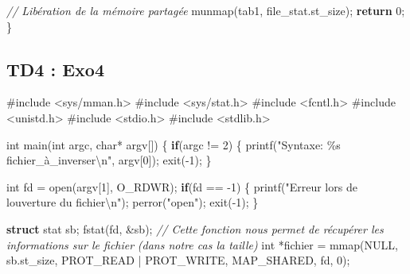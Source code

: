 \documentclass[
]{article}
\newenvironment{Shaded}{}{}
\newcommand{\CommentTok}[1]{\textcolor[rgb]{0.38,0.63,0.69}{\textit{#1}}}
\newcommand{\ControlFlowTok}[1]{\textcolor[rgb]{0.00,0.44,0.13}{\textbf{#1}}}
\newcommand{\DataTypeTok}[1]{\textcolor[rgb]{0.56,0.13,0.00}{#1}}
\newcommand{\DecValTok}[1]{\textcolor[rgb]{0.25,0.63,0.44}{#1}}
\newcommand{\ImportTok}[1]{#1}
\newcommand{\KeywordTok}[1]{\textcolor[rgb]{0.00,0.44,0.13}{\textbf{#1}}}
\newcommand{\NormalTok}[1]{#1}
\newcommand{\PreprocessorTok}[1]{\textcolor[rgb]{0.74,0.48,0.00}{#1}}
\newcommand{\SpecialCharTok}[1]{\textcolor[rgb]{0.25,0.44,0.63}{#1}}
\newcommand{\StringTok}[1]{\textcolor[rgb]{0.25,0.44,0.63}{#1}}
\begin{document}
\begin{Shaded}
\begin{Highlighting}[]
    \CommentTok{// Libération de la mémoire partagée}
\NormalTok{    munmap(tab1, file\_stat.st\_size);}
    \ControlFlowTok{return} \DecValTok{0}\NormalTok{;}
\NormalTok{\}}
\end{Highlighting}
\end{Shaded}

\hypertarget{td4-exo4}{%
\subsection{TD4 : Exo4}\label{td4-exo4}}

\begin{Shaded}
\begin{Highlighting}[]
\PreprocessorTok{\#include }\ImportTok{\textless{}sys/mman.h\textgreater{}}
\PreprocessorTok{\#include }\ImportTok{\textless{}sys/stat.h\textgreater{}}
\PreprocessorTok{\#include }\ImportTok{\textless{}fcntl.h\textgreater{}}
\PreprocessorTok{\#include }\ImportTok{\textless{}unistd.h\textgreater{}}
\PreprocessorTok{\#include }\ImportTok{\textless{}stdio.h\textgreater{}}
\PreprocessorTok{\#include }\ImportTok{\textless{}stdlib.h\textgreater{}}

\DataTypeTok{int}\NormalTok{ main(}\DataTypeTok{int}\NormalTok{ argc, }\DataTypeTok{char}\NormalTok{* argv[]) \{}
    \ControlFlowTok{if}\NormalTok{(argc != }\DecValTok{2}\NormalTok{) \{}
\NormalTok{        printf(}\StringTok{"Syntaxe: \%s fichier\_à\_inverser}\SpecialCharTok{\textbackslash{}n}\StringTok{"}\NormalTok{, argv[}\DecValTok{0}\NormalTok{]);}
\NormalTok{        exit({-}}\DecValTok{1}\NormalTok{);}
\NormalTok{    \}}

    \DataTypeTok{int}\NormalTok{ fd = open(argv[}\DecValTok{1}\NormalTok{], O\_RDWR);}
    \ControlFlowTok{if}\NormalTok{(fd == {-}}\DecValTok{1}\NormalTok{) \{}
\NormalTok{        printf(}\StringTok{"Erreur lors de l\textquotesingle{}ouverture du fichier}\SpecialCharTok{\textbackslash{}n}\StringTok{"}\NormalTok{);}
\NormalTok{        perror(}\StringTok{"open"}\NormalTok{);}
\NormalTok{        exit({-}}\DecValTok{1}\NormalTok{);}
\NormalTok{    \}}

    \KeywordTok{struct}\NormalTok{ stat sb;}
\NormalTok{    fstat(fd, \&sb); }\CommentTok{// Cette fonction nous permet de récupérer les informations sur le fichier}
\CommentTok{(dans notre cas la taille)}
    \DataTypeTok{int}\NormalTok{ *fichier = mmap(NULL, sb.st\_size, PROT\_READ | PROT\_WRITE, MAP\_SHARED, fd, }\DecValTok{0}\NormalTok{);}


\end{Highlighting}
\end{Shaded}
\end{document}
